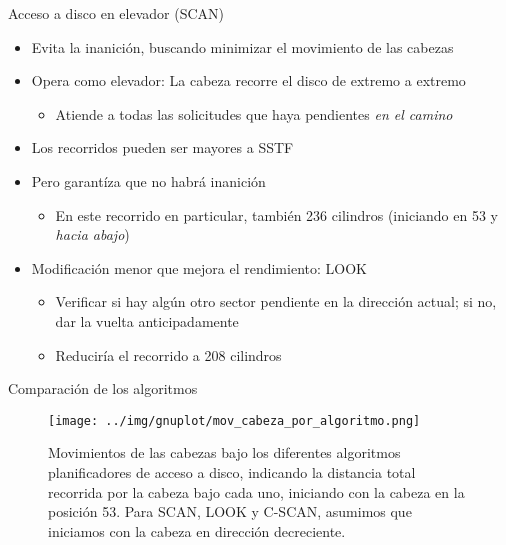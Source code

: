 \documentclass[presentation]{beamer}
\begin{document}
\begin{frame}[label={sec:org5223973}]{Acceso a disco en elevador (SCAN)}
\begin{itemize}
\item Evita la inanición, buscando minimizar el movimiento de las cabezas
\item Opera como elevador: La cabeza recorre el disco de extremo a extremo
\begin{itemize}
\item Atiende a todas las solicitudes que haya pendientes \emph{en el camino}
\end{itemize}
\item Los recorridos pueden ser mayores a SSTF
\item Pero garantíza que no habrá inanición
\begin{itemize}
\item En este recorrido en particular, también 236 cilindros (iniciando
en 53 y \emph{hacia abajo})
\end{itemize}
\item Modificación menor que mejora el rendimiento: LOOK
\begin{itemize}
\item Verificar si hay algún otro sector pendiente en la dirección
actual; si no, dar la vuelta anticipadamente
\item Reduciría el recorrido a 208 cilindros
\end{itemize}
\end{itemize}
\end{frame}

\begin{frame}[label={sec:orgaf5cf19}]{Comparación de los algoritmos}
\begin{figure}[htbp]
\centering
\texttt{[image: ../img/gnuplot/mov\_cabeza\_por\_algoritmo.png]}
\caption{Movimientos de las cabezas bajo los diferentes algoritmos planificadores de acceso a disco, indicando la distancia total recorrida por la cabeza bajo cada uno, iniciando con la cabeza en la posición 53. Para SCAN, LOOK y C-SCAN, asumimos que iniciamos con la cabeza en dirección decreciente.}
\end{figure}
\end{frame}
\end{document}
